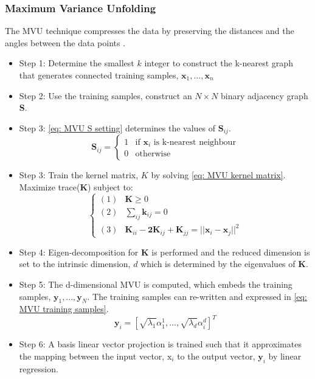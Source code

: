 \documentclass[11pt]{article}
\begin{document}
	\subsubsection{Maximum Variance Unfolding}
	The MVU technique compresses the data by preserving the distances and the angles between the data points \cite{Shao2009}. 
	\begin{itemize}
		\item Step 1: Determine the smallest $k$ integer to construct the k-nearest graph that generates connected training samples, $\textbf{x}_1, . . . ,\textbf{x}_n$ \\
		\item Step 2: Use the training samples, construct an $N \times N$ binary adjacency graph \textbf{S}. \\
		\item Step 3: \eqref{eq: MVU S setting} determines the values of $\textbf{S}_{ij}$.
		\begin{equation}
			\label{eq: MVU S setting}
			\textbf{S}_{ij} = 
			\begin{cases}
				1 & \text{if } \textbf{x}_i \text{ is k-nearest neighbour} \\
				0 & \text{otherwise}
			\end{cases}
		\end{equation}
		\item Step 3: Train the kernel matrix, $K$ by solving \eqref{eq: MVU kernel matrix}.
		\newline
		Maximize trace(\textbf{K}) subject to:
		\begin{equation}
			\label{eq: MVU kernel matrix}
			\begin{cases}
				(1) &\textbf{K} \geq 0 \\
				(2) &\sum_{ij}\textbf{k}_{ij} = 0 \\
				(3) &\textbf{K}_{ii} - \textbf{2K}_{ij} + \textbf{K}_{jj} = ||\textbf{x}_i - \textbf{x}_j||^2
			\end{cases}
		\end{equation}
		\item Step 4: Eigen-decomposition for $\textbf{K}$ is performed and the reduced dimension is set to the intrinsic dimension, $d$ which is determined by the eigenvalues of $\textbf{K}$.\\
		\item Step 5: The d-dimensional MVU is computed, which embeds the training samples, $\textbf{y}_1, . . . , \textbf{y}_N$. The training samples can re-written and expressed in \eqref{eq: MVU training samples}.
		\begin{equation}
			\label{eq: MVU training samples}
			\textbf{y}_i = [\sqrt{\lambda_1}\alpha_1^1, . . . ,\sqrt{\lambda_d}\alpha_i^d]^T
		\end{equation}
		\item Step 6: A basis linear vector projection is trained such that it approximates the mapping between the input vector, $\text{x}_i$ to the output vector, $\textbf{y}_i$ by linear regression.
	\end{itemize}
	
\end{document}
